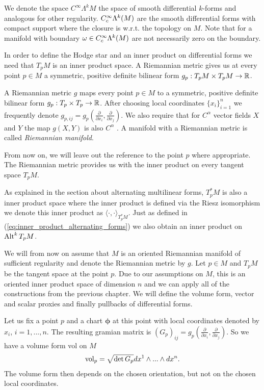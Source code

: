 \documentclass[../main.tex]{subfiles}
\begin{document}
We denote the space $C^\infty \Lambda^k M$ the 
space of smooth differential $k$-forms and analogous for other regularity.
$C_c^\infty \Lambda^{k}(M)$ are the smooth differential forms
with compact support where the closure is w.r.t. 
the topology on $M$. Note that for a manifold with boundary 
$\omega \in C_c^\infty \Lambda^{k}(M)$ are not necessarily zero on the boundary.

In order to define the Hodge star and an inner product on differential forms
we need that 
$T_p M$ is an inner product space.
A Riemannian metric gives us at every point $p \in M$ 
a symmetric, positive definite bilinear form 
$g_p: T_p M \times T_p M \rightarrow \mathbb{R}$. 
\begin{definition}
    A Riemannian metric $g$ maps every point $p\in M$ to 
    a symmetric, positive definite bilinear form $g_p: T_p \times T_p \rightarrow \mathbb{R}$.
    After choosing local coordinates $\{x_i\}_{i=1}^n$ we frequently denote 
    $g_{p,ij} = g_p(\frac{\partial}{\partial x_i}, \frac{\partial}{\partial x_j})$.
    We also require that for $C^\alpha$ vector fields $X$ and $Y$ the map 
    $g(X,Y)$ is also $C^\alpha$ . 
    A manifold with a Riemannian metric is called 
    \textit{Riemannian manifold}.
\end{definition}
From now on, we will leave out the reference to the point $p$ where appropriate.
The Riemannian metric provides us with the 
inner product on every tangent space $T_p M$. 

As explained in the section about alternating multilinear forms, $T^*_p M$ is also a 
inner product space where the inner product is defined via the Riesz isomorphism
we denote this inner product as $\langle \cdot, \cdot \rangle _{T^*_p M}$.
Just as defined in (\ref{eq:inner_product_alternating_forms}) 
we also obtain an inner product on 
${\text{Alt}^{k}\,T_p M}$.

We will from now on assume that $M$ is an oriented Riemannian manifold of sufficient 
regularity and denote the Riemannian metric by $g$.
Let $p \in M$ and $T_p M$ be the tangent space at the point $p$. 
Due to our assumptions on $M$, this is an oriented inner product space of 
dimension $n$ and we can apply 
all of the constructions from the previous chapter. 
We will define the volume form, vector and scalar proxies and finally pullbacks
of differential forms.

Let us fix a point $p$ and a chart $\boldsymbol{\phi}$ 
at this point with local coordinates denoted by $x_i$, $i=1,...,n$. 
The resulting gramian matrix is
$(G_p)_{ij} = g_p(\frac{\partial}{\partial x_i},\frac{\partial}{\partial x_j})$.
So we have a volume form vol on $M$ 
\begin{align*}
    \operatorname{vol}_p = \sqrt{\det G_p} dx^1 \wedge ... \wedge dx^n.
\end{align*}
The volume form then depends on the chosen orientation, but not on the 
chosen local coordinates.
\end{document}
